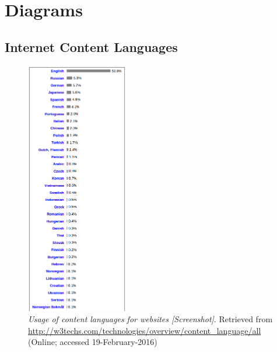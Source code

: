 \section{Diagrams}

\subsection{Internet Content Languages}

\begin{figure}[H]
	\centering
	\includegraphics[height=30em]{diagrams/w3techsInternetContentLang.png}
	\caption[a figure]{\textit{Usage of content languages for websites [Screenshot]}. Retrieved from \url{http://w3techs.com/technologies/overview/content_language/all} (Online; accessed 19-February-2016)}
	\label{fig:w3techLang}
\end{figure}

